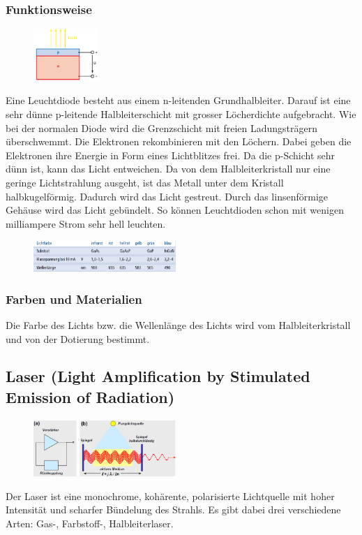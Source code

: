 \subsubsection{Funktionsweise}
\begin{figure}
    \centering
    \includegraphics[width=0.22\textwidth]{images/LED}
\end{figure}
Eine Leuchtdiode besteht aus einem n-leitenden Grundhalbleiter. Darauf ist eine sehr dünne p-leitende Halbleiterschicht mit grosser Löcherdichte aufgebracht. Wie bei der normalen Diode wird die Grenzschicht mit freien Ladungsträgern überschwemmt. Die Elektronen rekombinieren mit den Löchern. Dabei geben die Elektronen ihre Energie in Form eines Lichtblitzes frei. Da die p-Schicht sehr dünn ist, kann das Licht entweichen. Da von dem Halbleiterkristall nur eine geringe Lichtstrahlung ausgeht, ist das Metall unter dem Kristall halbkugelförmig. Dadurch wird das Licht gestreut. Durch das linsenförmige Gehäuse wird das Licht gebündelt. So können Leuchtdioden schon mit wenigen milliampere Strom sehr hell leuchten.

\begin{figure}
    \hspace{-70pt}
    \centering
    \includegraphics[width=0.48\textwidth]{images/kennwert_LED}
\end{figure}
\subsubsection{Farben und Materialien}
Die Farbe des Lichts bzw. die Wellenlänge des Lichts wird vom Halbleiterkristall und von der Dotierung bestimmt. \\

\newpage
\subsection{Laser (Light Amplification by Stimulated Emission of Radiation)}
\begin{figure}
    \vspace{-30pt}
    \centering
    \includegraphics[width=0.48\textwidth]{images/laser}
\end{figure}
Der Laser ist eine monochrome, kohärente, polarisierte Lichtquelle mit hoher Intensität und scharfer Bündelung des Strahls. Es gibt dabei drei verschiedene Arten: Gas-, Farbstoff-, Halbleiterlaser.

